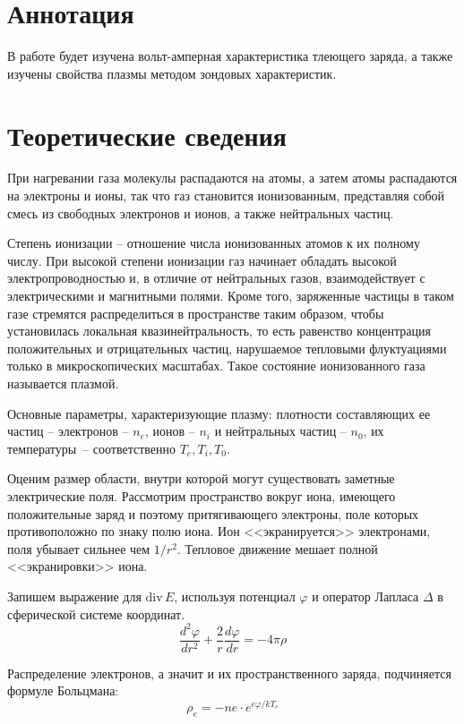  
\usepackage{mathrsfs}


\section{Аннотация}
В работе будет изучена вольт-амперная
характеристика тлеющего заряда, а также
изучены свойства плазмы методом зондовых
характеристик.
\section{Теоретические сведения}
При нагревании газа молекулы распадаются
на атомы, а затем атомы распадаются на
электроны и ионы, так что газ становится
ионизованным, представляя собой смесь из
свободных электронов и ионов, а также
нейтральных частиц.

Степень ионизации -- отношение
числа ионизованных атомов к их полному
числу. При высокой степени ионизации газ
начинает обладать высокой
электропроводностью и, в отличие от
нейтральных газов, взаимодействует с
электрическими и магнитными полями.
Кроме того, заряженные частицы в таком
газе стремятся распределиться в
пространстве таким образом, чтобы
установилась локальная
квазинейтральность, то есть равенство
концентрация положительных и
отрицательных частиц, нарушаемое
тепловыми флуктуациями только в
микроскопических масштабах. Такое
состояние ионизованного газа называется
плазмой.

Основные параметры, характеризующие
плазму: плотности составляющих ее частиц
-- электронов -- $n_e$, ионов -- $n_i$ и
нейтральных частиц -- $n_0$, их
температуры~-- соответственно $T_e, T_i,
T_0$. 

Оценим размер области, внутри которой
могут существовать заметные
электрические поля. Рассмотрим
пространство вокруг иона, имеющего
положительные заряд и поэтому
притягивающего электроны, поле которых
противоположно по знаку полю иона. Ион
<<экранируется>> электронами, поля
убывает сильнее чем $1/r^2$. Тепловое
движение мешает полной <<экранировки>>
иона.

Запишем выражение для $\text{div}\, E$,
используя потенциал $\varphi$ и оператор
Лапласа $\Delta$ в сферической системе
координат.
\begin{equation}
    \frac{d^2\varphi}{dr^2}+\frac{2}{r}\frac{d\varphi}{dr}
    = -4\pi\rho
\end{equation}


Распределение электронов, а значит и их
пространственного заряда, подчиняется
формуле Больцмана:
\begin{equation}
    \rho_e=-ne\cdot e^{e\varphi/kT_e}
\end{equation}


